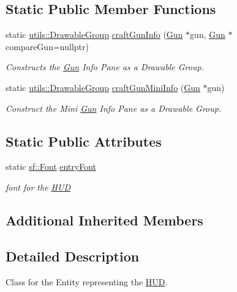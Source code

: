 \subsection*{Static Public Member Functions}
\begin{DoxyCompactItemize}
\item 
static \mbox{\hyperlink{structutils_1_1_drawable_group}{utils\+::\+Drawable\+Group}} \mbox{\hyperlink{class_h_u_d_aeaf2249ff2831b5083f9b87129038d9c}{craft\+Gun\+Info}} (\mbox{\hyperlink{class_gun}{Gun}} $\ast$gun, \mbox{\hyperlink{class_gun}{Gun}} $\ast$compare\+Gun=nullptr)
\begin{DoxyCompactList}\small\item\em Constructs the \mbox{\hyperlink{class_gun}{Gun}} Info Pane as a Drawable Group. \end{DoxyCompactList}\item 
static \mbox{\hyperlink{structutils_1_1_drawable_group}{utils\+::\+Drawable\+Group}} \mbox{\hyperlink{class_h_u_d_afb3619fbbcf5d463c87a33623d140b6a}{craft\+Gun\+Mini\+Info}} (\mbox{\hyperlink{class_gun}{Gun}} $\ast$gun)
\begin{DoxyCompactList}\small\item\em Construct the Mini \mbox{\hyperlink{class_gun}{Gun}} Info Pane as a Drawable Group. \end{DoxyCompactList}\end{DoxyCompactItemize}
\subsection*{Static Public Attributes}
\begin{DoxyCompactItemize}
\item 
\mbox{\label{class_h_u_d_a9ad91ce19f066e37dd87acd39c99859e}} 
static \mbox{\hyperlink{classsf_1_1_font}{sf\+::\+Font}} \mbox{\hyperlink{class_h_u_d_a9ad91ce19f066e37dd87acd39c99859e}{entry\+Font}}
\begin{DoxyCompactList}\small\item\em font for the \mbox{\hyperlink{class_h_u_d}{H\+UD}} \end{DoxyCompactList}\end{DoxyCompactItemize}
\subsection*{Additional Inherited Members}


\subsection{Detailed Description}
Class for the Entity representing the \mbox{\hyperlink{class_h_u_d}{H\+UD}}. 

